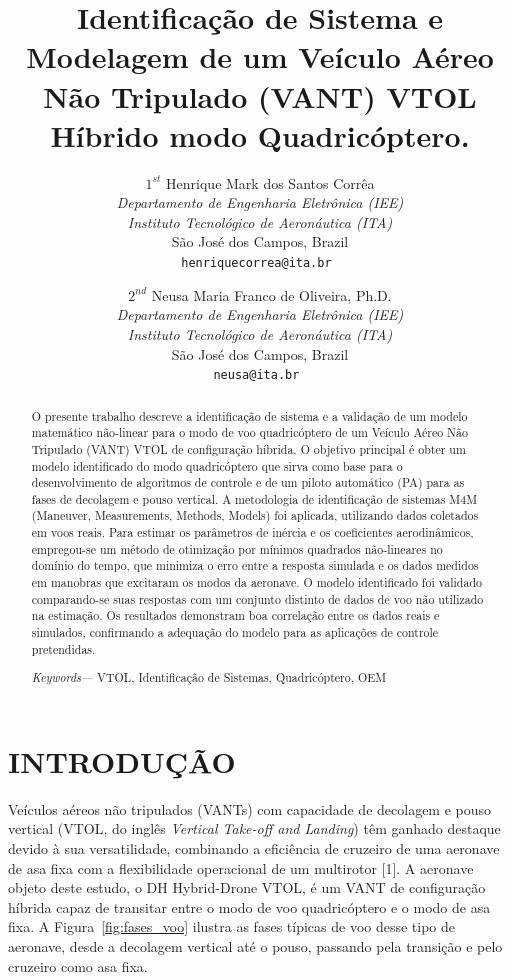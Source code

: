 \documentclass[letterpaper, 10 pt, conference]{ieeeconf}
\title{\LARGE \bf
Identificação de Sistema e Modelagem de um Veículo Aéreo Não Tripulado (VANT) VTOL Híbrido modo Quadricóptero.
}
\author{$1^{st}$ Henrique Mark dos Santos Corrêa%
\\
\textit{Departamento de Engenharia Eletrônica (IEE)} \\
\textit{Instituto Tecnológico de Aeronáutica (ITA)} \\
São José dos Campos, Brazil \\
\tt\small henriquecorrea@ita.br
\and
$2^{nd}$ Neusa Maria Franco de Oliveira, Ph.D.\\
\textit{Departamento de Engenharia Eletrônica (IEE)} \\
\textit{Instituto Tecnológico de Aeronáutica (ITA)} \\
São José dos Campos, Brazil \\
\tt\small neusa@ita.br
}
\begin{document}
\maketitle
\thispagestyle{empty}
\pagestyle{empty}

\begin{abstract}
O presente trabalho descreve a identificação de sistema e a validação de um modelo matemático não-linear para o modo de voo quadricóptero de um Veículo Aéreo Não Tripulado (VANT) VTOL de configuração híbrida. O objetivo principal é obter um modelo identificado do modo quadricóptero que sirva como base para o desenvolvimento de algoritmos de controle e de um piloto automático (PA) para as fases de decolagem e pouso vertical. A metodologia de identificação de sistemas M4M (Maneuver, Measurements, Methods, Models) foi aplicada, utilizando dados coletados em voos reais. Para estimar os parâmetros de inércia e os coeficientes aerodinâmicos, empregou-se um método de otimização por mínimos quadrados não-lineares no domínio do tempo, que minimiza o erro entre a resposta simulada e os dados medidos em manobras que excitaram os modos da aeronave. O modelo identificado foi validado comparando-se suas respostas com um conjunto distinto de dados de voo não utilizado na estimação. Os resultados demonstram boa correlação entre os dados reais e simulados, confirmando a adequação do modelo para as aplicações de controle pretendidas.

\textit{Keywords—} VTOL, Identificação de Sistemas, Quadricóptero, OEM
\end{abstract}


\section{INTRODUÇÃO}

Veículos aéreos não tripulados (VANTs) com capacidade de decolagem e pouso vertical (VTOL, do inglês \textit{Vertical Take-off and Landing}) têm ganhado destaque devido à sua versatilidade, combinando a eficiência de cruzeiro de uma aeronave de asa fixa com a flexibilidade operacional de um multirotor [1]. A aeronave objeto deste estudo, o DH Hybrid-Drone VTOL, é um VANT de configuração híbrida capaz de transitar entre o modo de voo quadricóptero e o modo de asa fixa. A Figura~\ref{fig:fases_voo} ilustra as fases típicas de voo desse tipo de aeronave, desde a decolagem vertical até o pouso, passando pela transição e pelo cruzeiro como asa fixa.
\end{document}
